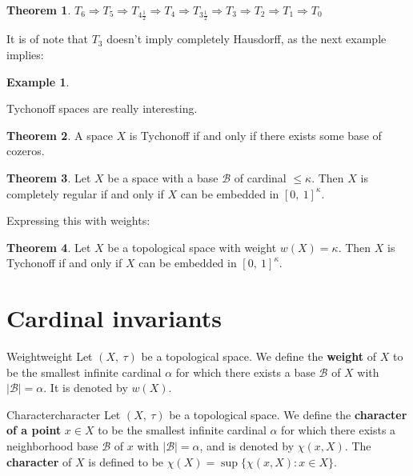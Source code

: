 \documentclass[a4paper]{book}
\theoremstyle{definition}
\newtheorem{theorem}{Theorem}[section]
\theoremstyle{ejemplo}
\newtheorem{example}{Example}[section]
\theoremstyle{demostracion}
\begin{document}
\begin{theorem}
	$T_6 \Rightarrow T_5 \Rightarrow T_{4\frac{1}{2}} \Rightarrow T_4 \Rightarrow T_{3\frac{1}{2}} \Rightarrow T_3 \Rightarrow T_2 \Rightarrow T_1 \Rightarrow T_0$
\end{theorem}

It is of note that $T_3$ doesn't imply completely Hausdorff, as the next example implies:
\begin{example}

\end{example}

Tychonoff spaces are really interesting.

\begin{theorem}
	A space $X$ is Tychonoff if and only if there exists some base of cozeros.
\end{theorem}

\begin{theorem}\label{thm_tychonoff_emb}
	Let $X$ be a space with a base $\mathcal{B}$ of cardinal $\leq \kappa$. Then $X$ is completely regular if and only if $X$ can be embedded in $[0,\ 1]^{\kappa}$.
\end{theorem}

Expressing this with weights:

\begin{theorem}
	Let $X$ be a topological space with weight $w(X) = \kappa$. Then $X$ is Tychonoff if and only if $X$ can be embedded in $[0,\ 1]^{\kappa}$.
\end{theorem}

\section{Cardinal invariants}
\begin{define}{Weight}{weight}
	Let $(X,\ \tau)$ be a topological space. We define the \textbf{weight} of $X$ to be the smallest infinite cardinal $\alpha$ for which there exists a base $\mathcal{B}$ of $X$ with $|\mathcal{B}| = \alpha$. It is denoted by $w(X)$.
\end{define}

\begin{define}{Character}{character}
	Let $(X,\ \tau)$ be a topological space. We define the \textbf{character of a point} $x\in X$ to be the smallest infinite cardinal $\alpha$ for which there exists a neighborhood base $\mathcal{B}$ of $x$ with $|\mathcal{B}| = \alpha$, and is denoted by $\chi(x, X)$. The \textbf{character} of $X$ is defined to be $\chi(X) = \sup\{\chi(x, X) : x \in X\}$.
\end{define}
\end{document}
